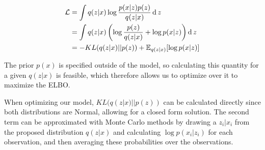 \documentclass[12pt]{article}
\begin{document}
\begin{align*}
   \mathcal{L} &= \int q(z|x) \log  \frac{p(x|z)p(z)}{q(z |x)}  \operatorname{\mathrm{d}} z \\
   &= \int q(z|x) \left( \log  \frac{p(z)}{q(z |x)} + \log p(x|z) \right) \operatorname{\mathrm{d}} z \\
   &= -KL(q(z|x) || p(z)) + \operatorname{\mathbb{E}}_{q(z|x)}[\log p(x|z)]
\end{align*}

The prior $p(x)$ is specified outside of the model, so calculating this quantity for a given $q(z|x)$ is feasible, which 
therefore allows us to optimize over it to maximize the ELBO. 

When optimizing our model, $KL(q(z|x) || p(z))$ can be calculated directly since both distributions are Normal, allowing 
for a closed form solution. The second term can be approximated with Monte Carlo methods by drawing a $z_i | x_i$ from the proposed distribution
$q(z|x)$ and calculating $\log p(x_i|z_i)$ for each observation, and then averaging these probabilities over the observations.
\end{document}
